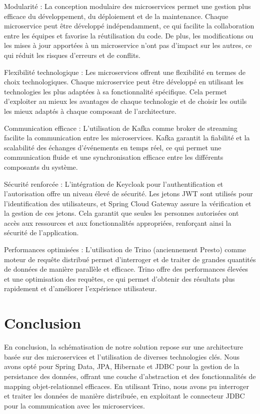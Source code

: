 Modularité : La conception modulaire des microservices permet une gestion plus efficace du développement, du déploiement et de la maintenance. Chaque microservice peut être développé indépendamment, ce qui facilite la collaboration entre les équipes et favorise la réutilisation du code. De plus, les modifications ou les mises à jour apportées à un microservice n'ont pas d'impact sur les autres, ce qui réduit les risques d'erreurs et de conflits.

Flexibilité technologique : Les microservices offrent une flexibilité en termes de choix technologiques. Chaque microservice peut être développé en utilisant les technologies les plus adaptées à sa fonctionnalité spécifique. Cela permet d'exploiter au mieux les avantages de chaque technologie et de choisir les outils les mieux adaptés à chaque composant de l'architecture.

Communication efficace : L'utilisation de Kafka comme broker de streaming facilite la communication entre les microservices. Kafka garantit la fiabilité et la scalabilité des échanges d'événements en temps réel, ce qui permet une communication fluide et une synchronisation efficace entre les différents composants du système.

Sécurité renforcée : L'intégration de Keycloak pour l'authentification et l'autorisation offre un niveau élevé de sécurité. Les jetons JWT sont utilisés pour l'identification des utilisateurs, et Spring Cloud Gateway assure la vérification et la gestion de ces jetons. Cela garantit que seules les personnes autorisées ont accès aux ressources et aux fonctionnalités appropriées, renforçant ainsi la sécurité de l'application.

Performances optimisées : L'utilisation de Trino (anciennement Presto) comme moteur de requête distribué permet d'interroger et de traiter de grandes quantités de données de manière parallèle et efficace. Trino offre des performances élevées et une optimisation des requêtes, ce qui permet d'obtenir des résultats plus rapidement et d'améliorer l'expérience utilisateur.


\section*{Conclusion}

En conclusion, la schématisation de notre solution repose sur une architecture basée sur des microservices et l'utilisation de diverses technologies clés. Nous avons opté pour Spring Data, JPA, Hibernate et JDBC pour la gestion de la persistance des données, offrant une couche d'abstraction et des fonctionnalités de mapping objet-relationnel efficaces. En utilisant Trino, nous avons pu interroger et traiter les données de manière distribuée, en exploitant le connecteur JDBC pour la communication avec les microservices.